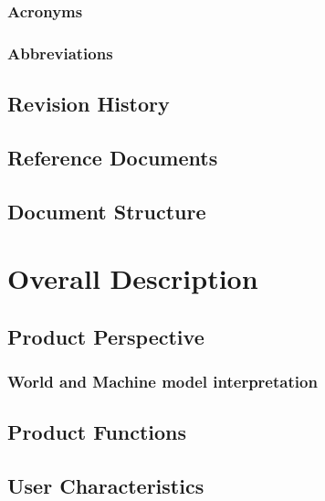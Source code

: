 \documentclass[numbers=noenddot, 12pt, a4paper, oneside]{scrbook}
\begin{document}
\subsection*{Acronyms}



\subsection*{Abbreviations}



\section{Revision History}



\section{Reference Documents}



\section{Document Structure}



\chapter{Overall Description}

\section{Product Perspective}


\subsection*{World and Machine model interpretation}



\section{Product Functions}



\section{User Characteristics}
\end{document}
